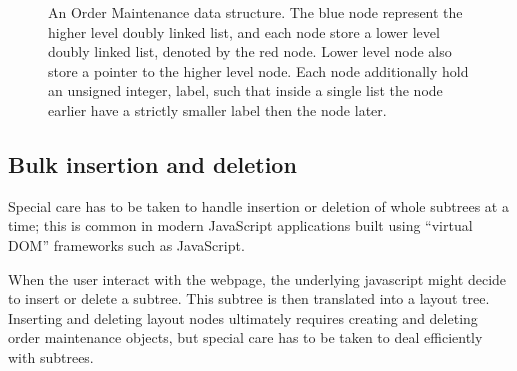\begin{figure}
\caption{An Order Maintenance data structure. The blue node represent the higher level doubly linked list, and each node store a lower level doubly linked list, denoted by the red node. Lower level node also store a pointer to the higher level node. Each node additionally hold an unsigned integer, label, such that inside a single list the node earlier have a strictly smaller label then the node later.}
\label{fig:om}
\end{figure}

\subsection{Bulk insertion and deletion}
Special care has to be taken to handle insertion or deletion
  of whole subtrees at a time;
  this is common in modern JavaScript applications built
  using ``virtual DOM'' frameworks such as JavaScript.

When the user interact with the webpage, the underlying javascript might decide to insert or delete a subtree. This subtree is then translated into a layout tree.
Inserting and deleting layout nodes
  ultimately requires creating and deleting
  order maintenance objects,
  but special care has to be taken to
  deal efficiently with subtrees.

